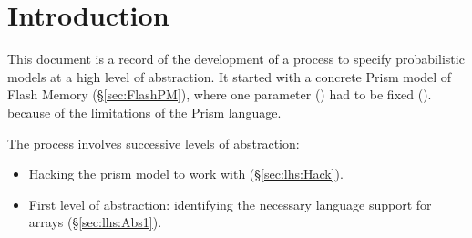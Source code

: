 \section{Introduction}\label{sec:intro}

This document is a record of the development of a process
to specify probabilistic models at a high level of abstraction.
It started with a concrete Prism model of Flash Memory (\S\ref{sec:FlashPM}),
where one parameter ()
had to be fixed ().
because of the limitations of the Prism language.

The process involves successive levels of abstraction:
\begin{itemize}
  \item
    Hacking the prism model to work with 
    (\S\ref{sec:lhs:Hack}).
  \item
    First level of abstraction:
    identifying the necessary language support for arrays
    (\S\ref{sec:lhs:Abs1}).
\end{itemize}
